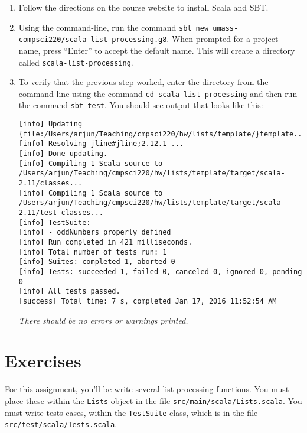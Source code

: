 \documentclass[9pt]{extbook}
\begin{document}
\begin{enumerate}

\item Follow the directions on the course website to install Scala and SBT.

\item Using the command-line, run the command
\verb|sbt new umass-compsci220/scala-list-processing.g8|. When prompted for
a project name, press ``Enter'' to accept the default name.
This will create a directory called \verb|scala-list-processing|. 

\item To verify that the previous step worked, enter the directory from
the command-line using the command \verb|cd scala-list-processing|
and then run the command \verb|sbt test|. You should
see output that looks like this:

\lstset{language=console}
\begin{lstlisting}
[info] Updating {file:/Users/arjun/Teaching/cmpsci220/hw/lists/template/}template...
[info] Resolving jline#jline;2.12.1 ...
[info] Done updating.
[info] Compiling 1 Scala source to /Users/arjun/Teaching/cmpsci220/hw/lists/template/target/scala-2.11/classes...
[info] Compiling 1 Scala source to /Users/arjun/Teaching/cmpsci220/hw/lists/template/target/scala-2.11/test-classes...
[info] TestSuite:
[info] - oddNumbers properly defined
[info] Run completed in 421 milliseconds.
[info] Total number of tests run: 1
[info] Suites: completed 1, aborted 0
[info] Tests: succeeded 1, failed 0, canceled 0, ignored 0, pending 0
[info] All tests passed.
[success] Total time: 7 s, completed Jan 17, 2016 11:52:54 AM
\end{lstlisting}
\lstset{language=scala}

\noindent \emph{There should be no errors or warnings printed.}

\end{enumerate}

\section{Exercises}

For this assignment, you'll be write several list-processing
functions. You must place these within the \verb|Lists| object in the
file \verb|src/main/scala/Lists.scala|.
You must write tests cases, within the \verb|TestSuite|
class, which is in the file \verb|src/test/scala/Tests.scala|.
\end{document}
